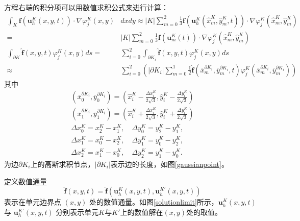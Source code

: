 \documentclass[a4paper, 12pt, UTF8]{ctexart}
\newcommand{\bs}[1]{\boldsymbol{#1}}
\begin{document}
方程右端的积分项可以用数值求积公式来进行计算：
\begin{equation}
\begin{split}
\int_{K} \bs f\left(\bs u_{h}^K(x, y, t)\right) \cdot  \nabla \varphi_{j}^K(x, y) &d x d y 
\approx |K| \sum_{m=0}^{2} \frac{1}{3} \bs f\left(\bs u_{h}^K\left(\hat{x}_{m}^K, \hat{y}_{m}^K, t\right)\right) \cdot \nabla \varphi_{j}^K\left(\hat{x}_{m}^K, \hat{y}_{m}^K\right)\\
=&|K| \sum_{m=0}^{2} \frac{1}{3} \bs f\left(\bs{u}^K_{m}(t)\right) \cdot \nabla \varphi_{j}^K\left(\hat{x}_{m}^K, \hat{y}_{m}^K\right)\\
\int_{\partial K}\hat{\bs f}\left(x, y, t\right) \varphi_{j}^K(x, y) d s
=&\sum_{i=0}^{2} \int_{\partial K_{i}}\hat{\bs f}(x, y, t)\varphi_{j}^K(x, y) d s \\
\approx& \sum_{i=0}^{2}\left(\left|\partial K_{i}\right| \sum_{m=0}^{1} \frac{1}{2} \hat{\bs f}\left(\bar{x}_{m}^{\partial K_i}, \bar{y}_{m}^{\partial K_i}, t\right)\varphi_{j}^K\left(\bar{x}_{m}^{\partial K_i}, \bar{y}_{m}^{\partial K_i}\right)\right)
\end{split}
\end{equation}
其中 
\begin{equation}
\begin{split}
\left(\bar{x}_{0}^{\partial K_i}, \bar{y}_{0}^{\partial K_i}\right)=\left(\hat{x}_{i}^K-\frac{\Delta x_{i}^K}{2\sqrt{3}},
 \hat{y}_{i}^K-\frac{\Delta y_{i}^K}{2\sqrt{3}} \right) \\
  \left(\bar{x}_{1}^{\partial K_i}, \bar{y}_{1}^{\partial K_i} \right)=\left(\hat{x}_{i}^K+\frac{\Delta x_{i}^K}{2\sqrt{3}} ,\hat{y}_{i}^K+\frac{\Delta y_{i}^K}{2\sqrt{3}}\right)\\
 \Delta x_{0}^K=x_{2}^K-x_{1}^K ,\quad \Delta y_{0}^K=y_{2}^K-y_{1}^K,\\  \Delta x_{1}^K=x_{0}^K-x_{2}^K ,\quad \Delta y_{1}^K=y_{0}^K-y_{2}^K,\\
  \Delta x_{2}^K=x_{1}^K-x_{0}^K ,\quad \Delta y_{2}^K=y_{1}^K-y_{0}^K.
    \end{split}
\end{equation}
 为边$\partial K_i$上的高斯求积节点，$|\partial K_{i}|$表示边的长度，如图\ref{gaussianpoint}。

\newpage
    

定义数值通量
\begin{equation}
\hat{\bs f}(x, y, t)=\hat{\bs f}\left({\bs u_{h}^{K}\left(x, y, t\right)}, {\bs u_{h}^{K'}\left(x, y, t\right)}\right)
\end{equation}
 表示在单元边界点 $(x,y)$ 处的数值通量。如图\ref{solutionlimit}所示，$\bs u_{h}^{K}\left(x, y, t\right)$ 与 $\bs u_{h}^{K'}\left(x, y, t\right)$ 分别表示单元$K$与$K'$上的数值解在$(x,y)$处的取值。
 
\end{document}

